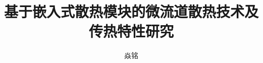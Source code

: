 \documentclass[promaster,eversion]{thesis-guet}
\title{基于嵌入式散热模块的微流道散热技术及传热特性研究}{Research on microfluidic heat dissipation technology and heat transfer characteristics based on embedded heat dissipation module}
\author{焱铭}
\begin{document}
    \makecover %
    \originalitydeclaration %
    \thesisfigurelist %
    \thesistablelist %
    \thesissymbollist %
    \thesistableofcontents %

    
    
    
    
    
    

    \thesisacknowledgement %
    \thesisaccomplish

    
\end{document}
